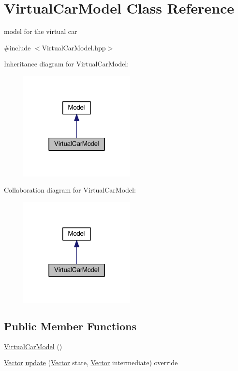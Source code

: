 \hypertarget{classVirtualCarModel}{}\section{Virtual\+Car\+Model Class Reference}
\label{classVirtualCarModel}


model for the virtual car  




{\ttfamily \#include $<$Virtual\+Car\+Model.\+hpp$>$}



Inheritance diagram for Virtual\+Car\+Model\+:\nopagebreak
\begin{figure}[H]
\begin{center}
\leavevmode
\includegraphics[width=166pt]{classVirtualCarModel__inherit__graph}
\end{center}
\end{figure}


Collaboration diagram for Virtual\+Car\+Model\+:\nopagebreak
\begin{figure}[H]
\begin{center}
\leavevmode
\includegraphics[width=166pt]{classVirtualCarModel__coll__graph}
\end{center}
\end{figure}
\subsection*{Public Member Functions}
\begin{DoxyCompactItemize}
\item 
\hyperlink{classVirtualCarModel_afc13c0d05e11bff23eb1b48402c5aa4a}{Virtual\+Car\+Model} ()
\item 
\hyperlink{Agent_8hpp_a5dd127bb3cb18b011cf5fd80a906e830}{Vector} \hyperlink{classVirtualCarModel_ab7a61fe2ce2180bd330dbf2819249457}{update} (\hyperlink{Agent_8hpp_a5dd127bb3cb18b011cf5fd80a906e830}{Vector} state, \hyperlink{Agent_8hpp_a5dd127bb3cb18b011cf5fd80a906e830}{Vector} intermediate) override
\end{DoxyCompactItemize}
